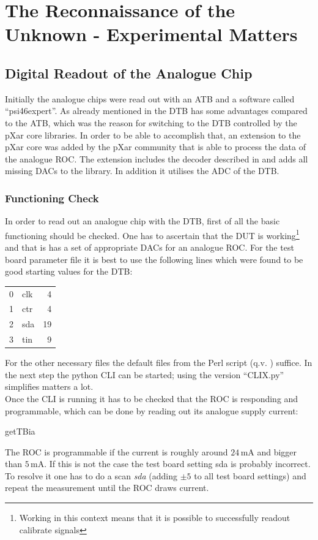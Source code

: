 \documentclass[british,11pt,a4paper]{memoir}
\begin{document}
\chapter{The Reconnaissance of the Unknown - Experimental Matters}
\section{Digital Readout of the Analogue Chip}
Initially the analogue chips were read out with an \ac{ATB} and a software called ``psi46expert''. As already mentioned in  the \ac{DTB} has some advantages compared to the \ac{ATB}, which was the reason for switching to the \ac{DTB} controlled by the pXar core libraries. In order to be able to accomplish that, an extension to the pXar core was added by the pXar community that is able to process the data of the analogue \ac{ROC}. The extension includes the decoder described in  and adds all missing \ac{DAC}s to the library. In addition it utilises the \ac{ADC} of the \ac{DTB}.
\subsection{Functioning Check}
In order to read out an analogue chip with the \ac{DTB}, first of all the basic functioning should be checked. One has to ascertain that the \ac{DUT} is working\footnote{Working in this context means that it is possible to successfully readout calibrate signals} and that is has a set of appropriate \ac{DAC}s for an analogue \ac{ROC}. For the test board parameter file it is best to use the following lines which were found to be good starting values for the \ac{DTB}:\s
{\ubuntu
\begin{tabular}{llr}
	0	&   clk	&  4\\
	1	&	ctr	&  4\\
	2	&	sda	&  19\\
	3	&	tin	&  9
\end{tabular}}\no\s
For the other necessary files the default files from the Perl script (q.v. ) suffice. In the next step the python \ac{CLI} can be started; using the version ``CLIX.py'' simplifies matters a lot.\\
Once the \ac{CLI} is running it has to be checked that the \ac{ROC} is responding and programmable, which can be done by reading out its analogue supply current:
\begin{itemize}
	\tri getTBia
\end{itemize}
The \ac{ROC} is programmable if the current is roughly around $24\,$mA and bigger than $5\,$mA. If this is not the case the test board setting sda is probably incorrect. To resolve it one has to do a scan \textit{sda} (adding $\pm5$ to all test board settings) and repeat the measurement until the \ac{ROC} draws current.
\end{document}
